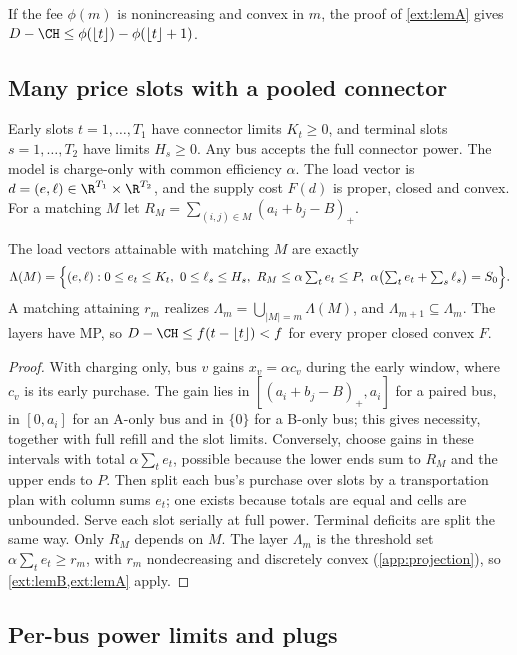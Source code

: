 \begin{remark}
If the fee $\phi(m)$ is nonincreasing and convex in $m$, the proof of
\cref{ext:lemA} gives
$D-\CH\le\phi(\lfloor t\rfloor)-\phi(\lfloor t\rfloor+1)$.
\end{remark}

\subsection*{Many price slots with a pooled connector}

Early slots $t=1,\dots,T_1$ have connector limits $K_t\ge0$, and terminal slots
$s=1,\dots,T_2$ have limits $H_s\ge0$. Any bus accepts the full connector
power. The model is charge-only with common efficiency $\alpha$. The load
vector is $d=(e,\ell)\in\R^{T_1}\times\R^{T_2}$, and the supply cost $F(d)$ is
proper, closed and convex. For a matching $M$ let
$R_M=\sum_{(i,j)\in M}(a_i+b_j-B)_+$.

\begin{theorem}\label{ext:thm1}
The load vectors attainable with matching $M$ are exactly
\[
\Lambda(M)=\Bigl\{(e,\ell):0\le e_t\le K_t,\ 0\le \ell_s\le H_s,\
R_M\le\alpha\textstyle\sum_te_t\le P,\ \alpha\bigl(\sum_te_t+\sum_s\ell_s\bigr)=S_0\Bigr\}.
\]
A matching attaining $r_m$ realizes $\Lambda_m=\bigcup_{|M|=m}\Lambda(M)$, and
$\Lambda_{m+1}\subseteq\Lambda_m$. The layers have MP, so
$D-\CH\le f(t-\lfloor t\rfloor)<f$ for every proper closed convex $F$.
\end{theorem}
\begin{proof}
With charging only, bus $v$ gains $x_v=\alpha c_v$ during the early window,
where $c_v$ is its early purchase. The gain lies in $[(a_i+b_j-B)_+,a_i]$ for a
paired bus, in $[0,a_i]$ for an A-only bus and in $\{0\}$ for a B-only bus;
this gives necessity, together with full refill and the slot limits.
Conversely, choose gains in these intervals with total $\alpha\sum_te_t$,
possible because the lower ends sum to $R_M$ and the upper ends to $P$. Then
split each bus's purchase over slots by a transportation plan with column sums
$e_t$; one exists because totals are equal and cells are unbounded. Serve each
slot serially at full power. Terminal deficits are split the same way. Only
$R_M$ depends on $M$. The layer $\Lambda_m$ is the threshold set
$\alpha\sum_te_t\ge r_m$, with $r_m$ nondecreasing and discretely convex
(\cref{app:projection}), so \cref{ext:lemB,ext:lemA} apply.
\end{proof}

\subsection*{Per-bus power limits and plugs}

